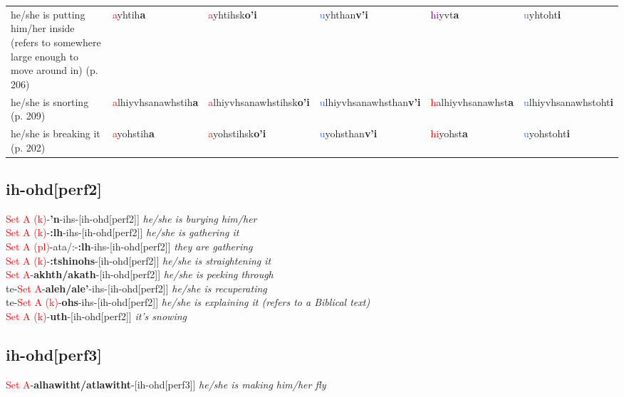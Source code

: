 \documentclass[oneside,openany]{book}%
\begin{document}
\begin{tabularx}{\textwidth}{>{\hsize=1.5\hsize\RaggedRight}X >{\hsize=0.9\hsize}X >{\hsize=0.9\hsize}X >{\hsize=0.9\hsize}X >{\hsize=0.9\hsize}X >{\hsize=0.9\hsize}X}
he/she is putting him/her inside (refers to somewhere large enough to move around in) (p. 206)&\textcolor{Red}{a}yhtih\textbf{a}&\textcolor{Red}{a}yhtihsk\textbf{o'i}&\textcolor{RoyalBlue}{u}yhthan\textbf{v'i}&\textcolor{Purple}{hi}yvt\textbf{a}&\textcolor{RoyalBlue}{u}yhtoht\textbf{i}\\%
he/she is snorting (p. 209)&\textcolor{Red}{a}lhiyvhsanawhstih\textbf{a}&\textcolor{Red}{a}lhiyvhsanawhstihsk\textbf{o'i}&\textcolor{RoyalBlue}{u}lhiyvhsanawhsthan\textbf{v'i}&\textcolor{Red}{h}alhiyvhsanawhst\textbf{a}&\textcolor{RoyalBlue}{u}lhiyvhsanawhstoht\textbf{i}\\%
he/she is breaking it (p. 202)&\textcolor{Red}{a}yohstih\textbf{a}&\textcolor{Red}{a}yohstihsk\textbf{o'i}&\textcolor{RoyalBlue}{u}yohsthan\textbf{v'i}&\textcolor{Red}{hi}yohst\textbf{a}&\textcolor{RoyalBlue}{u}yohstoht\textbf{i}\\%
\bottomrule%
\end{tabularx}%
\vspace{1em}%
\needspace{1in}%
\subsection*{ih-ohd[perf2]}%
\textcolor{Red}{Set A (k)}{-}\textbf{'n}{-}ihs{-}[ih-ohd[perf2]] \textit{ he/she is burying him/her} \\%
\textcolor{Red}{Set A (k)}{-}\textbf{:lh}{-}ihs{-}[ih-ohd[perf2]] \textit{ he/she is gathering it} \\%
\textcolor{Red}{Set A (pl)}{-}ata/:{-}\textbf{:lh}{-}ihs{-}[ih-ohd[perf2]] \textit{ they are gathering} \\%
\textcolor{Red}{Set A (k)}{-}\textbf{:tshinohs}{-}[ih-ohd[perf2]] \textit{ he/she is straightening it} \\%
\textcolor{Red}{Set A}{-}\textbf{akhth/akath}{-}[ih-ohd[perf2]] \textit{ he/she is peeking through} \\%
te{-}\textcolor{Red}{Set A}{-}\textbf{aleh/ale'}{-}ihs{-}[ih-ohd[perf2]] \textit{ he/she is recuperating} \\%
te{-}\textcolor{Red}{Set A (k)}{-}\textbf{ohs}{-}ihs{-}[ih-ohd[perf2]] \textit{ he/she is explaining it (refers to a Biblical text)} \\%
\textcolor{Red}{Set A (k)}{-}\textbf{uth}{-}[ih-ohd[perf2]] \textit{ it's snowing} \\%
\vspace{1em}%
\needspace{1in}%
\subsection*{ih-ohd[perf3]}%
\textcolor{Red}{Set A}{-}\textbf{alhawitht/atlawitht}{-}[ih-ohd[perf3]] \textit{ he/she is making him/her fly} \\%
\vspace{1em}%
\needspace{1in}%
\end{document}
